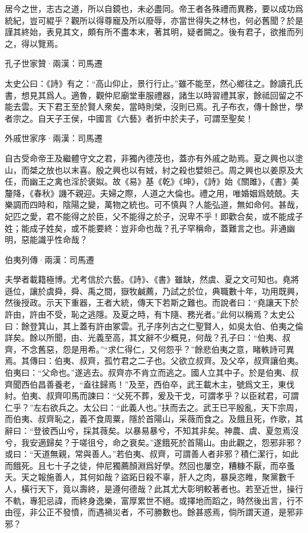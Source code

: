 \documentclass[12pt,a4paper]{ctexbook}
\begin{document}
居今之世，志古之道，所以自鏡也，未必盡同。帝王者各殊禮而異務，要以成功爲統紀，豈可緄乎？觀所以得尊寵及所以廢辱，亦當世得失之林也，何必舊聞？於是謹其終始，表見其文，頗有所不盡本末，著其明，疑者闕之。後有君子，欲推而列之，得以覽焉。\par
孔子世家贊·兩漢：司馬遷 \par
太史公曰：《詩》有之：“高山仰止，景行行止。”雖不能至，然心鄉往之。餘讀孔氏書，想見其爲人。適魯，觀仲尼廟堂車服禮器，諸生以時習禮其家，餘祗回留之不能去雲。天下君王至於賢人衆矣，當時則榮，沒則已焉。孔子布衣，傳十餘世，學者宗之。自天子王侯，中國言《六藝》者折中於夫子，可謂至聖矣！\par
外戚世家序·兩漢：司馬遷 \par
自古受命帝王及繼體守文之君，非獨內德茂也，蓋亦有外戚之助焉。夏之興也以塗山，而桀之放也以末喜。殷之興也以有娀，紂之殺也嬖妲己。周之興也以姜原及大任，而幽王之禽也淫於褒姒。故《易》基《乾》《坤》，《詩》始《關雎》，《書》美釐降，《春秋》譏不親迎。夫婦之際，人道之大倫也。禮之用，唯婚姻爲兢兢。夫樂調而四時和，陰陽之變，萬物之統也。可不慎與？人能弘道，無如命何。甚哉，妃匹之愛，君不能得之於臣，父不能得之於子，況卑不乎！即歡合矣，或不能成子姓；能成子姓矣，或不能要終：豈非命也哉？孔子罕稱命，蓋難言之也。非通幽明，惡能識乎性命哉？\par
伯夷列傳·兩漢：司馬遷 \par
夫學者載籍極博。尤考信於六藝。《詩》、《書》雖缺，然虞、夏之文可知也。堯將遜位，讓於虞舜，舜、禹之間，嶽牧鹹薦，乃試之於位，典職數十年，功用既興，然後授政。示天下重器，王者大統，傳天下若斯之難也。而說者曰：“堯讓天下於許由，許由不受，恥之逃隱。及夏之時，有卞隨、務光者。”此何以稱焉？太史公曰：餘登箕山，其上蓋有許由冢雲。孔子序列古之仁聖賢人，如吳太伯、伯夷之倫詳矣。餘以所聞，由、光義至高，其文辭不少概見，何哉？孔子曰：“伯夷、叔齊，不念舊惡，怨是用希。”“求仁得仁，又何怨乎？”餘悲伯夷之意，睹軼詩可異焉。其傳曰：伯夷、叔齊，孤竹君之二子也。父欲立叔齊。及父卒，叔齊讓伯夷。伯夷曰：“父命也。”遂逃去。叔齊亦不肯立而逃之。國人立其中子。於是伯夷、叔齊聞西伯昌善養老，“盍往歸焉！”及至，西伯卒，武王載木主，號爲文王，東伐紂。伯夷、叔齊叩馬而諫曰：“父死不葬，爰及干戈，可謂孝乎？以臣弒君，可謂仁乎？”左右欲兵之。太公曰：“此義人也。”扶而去之。武王已平殷亂，天下宗周，而伯夷、叔齊恥之，義不食周粟，隱於首陽山，采薇而食之。及餓且死，作歌，其辭曰：“登彼西山兮，採其薇矣。以暴易暴兮，不知其非矣。神農、虞、夏忽焉沒兮，我安適歸矣？于嗟徂兮，命之衰矣。”遂餓死於首陽山。由此觀之，怨邪非邪？ 或曰：“天道無親，常與善人。”若伯夷、叔齊，可謂善人者非邪？積仁潔行，如此而餓死。且七十子之徒，仲尼獨薦顏淵爲好學。然回也屢空，糟糠不厭，而卒蚤夭。天之報施善人，其何如哉？盜跖日殺不辜，肝人之肉，暴戾恣睢，聚黨數千人，橫行天下，竟以壽終，是遵何德哉？此其尤大彰明較著者也。若至近世，操行不軌，專犯忌諱，而終身逸樂，富厚累世不絕。或擇地而蹈之，時然後出言，行不由徑，非公正不發憤，而遇禍災者，不可勝數也。餘甚惑焉，倘所謂天道，是邪非邪？\par
\end{document}

